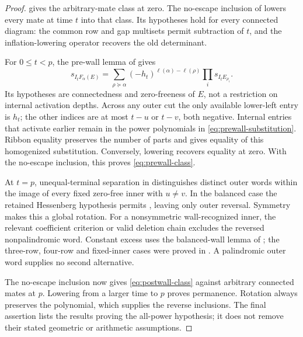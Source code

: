 \documentclass[11pt,a4paper]{amsart}
\numberwithin{equation}{section}
\theoremstyle{plain}
\theoremstyle{definition}
\begin{document}
\begin{proof}
 gives the arbitrary-mate class at zero.  The no-escape inclusion of \cite{Shields2026Inflation} lowers every mate at time \(t\) into that class.  Its hypotheses hold for every connected diagram: the common row and gap multisets permit subtraction of \(t\), and the inflation-lowering operator recovers the old determinant.

For \(0\le t<p\), the pre-wall lemma of \cite{Shields2026PowerRigidity} gives
\begin{equation}\label{eq:prewall-substitution}
 s_{I_tF_\alpha(E)}
 =\sum_{\rho\succeq\alpha}(-h_t)^{\ell(\alpha)-\ell(\rho)}
       \prod_i s_{I_tE_{\rho_i}}.
\end{equation}
Its hypotheses are connectedness and zero-freeness of \(E\), not a restriction on internal activation depths.  Across any outer cut the only available lower-left entry is \(h_t\); the other indices are at most \(t-u\) or \(t-v\), both negative.  Internal entries that activate earlier remain in the power polynomials in \eqref{eq:prewall-substitution}.  Ribbon equality preserves the number of parts and gives equality of this homogenized substitution.  Conversely, lowering recovers equality at zero.  With the no-escape inclusion, this proves \eqref{eq:prewall-class}.

At \(t=p\), unequal-terminal separation in \cite{Shields2026PowerRigidity} distinguishes distinct outer words within the image of every fixed zero-free inner with \(u\ne v\).  In the balanced case the retained Hessenberg hypothesis permits , leaving only outer reversal.  Symmetry makes this a global rotation.  For a nonsymmetric wall-recognized inner, the relevant coefficient criterion or valid deletion chain excludes the reversed nonpalindromic word.  Constant excess uses the balanced-wall lemma of \cite{Shields2026PowerRigidity}; the three-row, four-row and fixed-inner cases were proved in .  A palindromic outer word supplies no second alternative.

The no-escape inclusion now gives \eqref{eq:postwall-class} against arbitrary connected mates at \(p\).  Lowering from a larger time to \(p\) proves permanence.  Rotation always preserves the polynomial, which supplies the reverse inclusions.  The final assertion lists the results proving the all-power hypothesis; it does not remove their stated geometric or arithmetic assumptions.
\end{proof}
\end{document}
